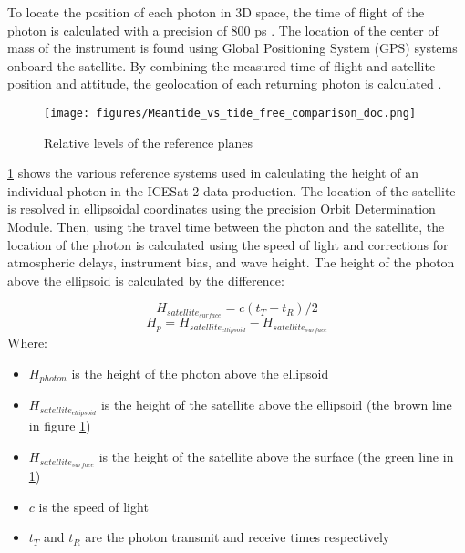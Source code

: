 To locate the position of each photon in 3D space, the time of flight of the photon is calculated with a precision of 800 ps \parencite{Neumann2019d}. The location of the center of mass of the instrument is found using Global Positioning System (GPS) systems onboard the satellite. By combining the measured time of flight and satellite position and attitude, the geolocation of each returning photon is calculated \parencite{Neumann2019d}.


\begin{figure}[h]
      \centering
      \texttt{[image: figures/Meantide\_vs\_tide\_free\_comparison\_doc.png]}
      \caption{Relative levels of the reference planes}
      \label{fig:geoids-ellipsoids-graphics}
\end{figure}

\ref{fig:geoids-ellipsoids-graphics} shows the various reference systems used in calculating the height of an individual photon in the ICESat-2 data production. The location of the satellite is resolved in ellipsoidal coordinates using the precision Orbit Determination Module. Then, using the travel time between the photon and the satellite, the location of the photon is calculated using the speed of light and corrections for atmospheric delays, instrument bias, and wave height. The height of the photon above the ellipsoid is calculated by the difference:


\begin{equation}\label{eq:raw_photon_calculation}
      H_{satellite_{surface}} = c(t_T-t_R)/2
\end{equation}
\begin{equation}
      H_p = H_{satellite_{ellipsoid}} - H_{satellite_{surface}}
\end{equation}
Where:
\begin{itemize}
      \item $H_{photon}$ is the height of the photon above the ellipsoid
      \item $H_{satellite_{ellipsoid}}$ is the height of the satellite above the ellipsoid (the brown line in figure \ref{fig:geoids-ellipsoids-graphics})
      \item $H_{satellite_{surface}}$ is the height of the satellite above the surface (the green line in \ref{fig:geoids-ellipsoids-graphics})
      \item $c$ is the speed of light
      \item $t_T$ and $t_R$ are the photon transmit and receive times respectively
\end{itemize}

